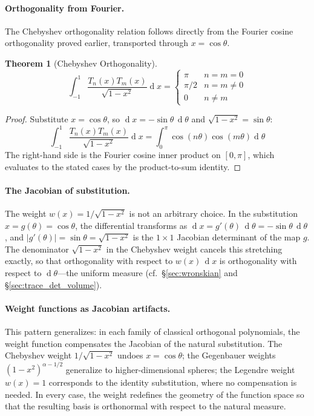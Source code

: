 \documentclass[12pt,a4paper]{report}
\DeclareMathOperator{\deriv}{d}
\theoremstyle{thms}
\newtheorem{theorem}{Theorem}[section]
\theoremstyle{defns}
\begin{document}
\paragraph{Orthogonality from Fourier.} The Chebyshev orthogonality relation follows directly from the Fourier cosine orthogonality proved earlier, transported through $x = \cos\theta$.

\begin{theorem}[Chebyshev Orthogonality]
    \begin{equation}
        \int_{-1}^{1} \dfrac{T_n(x)T_m(x)}{\sqrt{1-x^2}}\deriv{x} = \begin{cases} \pi & n = m = 0 \\ \pi/2 & n = m \neq 0 \\ 0 & n \neq m \end{cases}
    \end{equation}
\end{theorem}

\begin{proof}
    Substitute $x = \cos\theta$, so $\deriv{x} = -\sin\theta\,\deriv\theta$ and $\sqrt{1-x^2} = \sin\theta$:
    \begin{equation}
        \int_{-1}^{1} \dfrac{T_n(x)T_m(x)}{\sqrt{1-x^2}}\deriv{x} = \int_{0}^{\pi} \cos(n\theta)\cos(m\theta)\deriv\theta
    \end{equation}
    The right-hand side is the Fourier cosine inner product on $[0, \pi]$, which evaluates to the stated cases by the product-to-sum identity.
\end{proof}

\paragraph{The Jacobian of substitution.} The weight $w(x) = 1/\sqrt{1-x^2}$ is not an arbitrary choice. In the substitution $x = g(\theta) = \cos\theta$, the differential transforms as $\deriv x = g'(\theta)\,\deriv\theta = -\sin\theta\,\deriv\theta$, and $|g'(\theta)| = \sin\theta = \sqrt{1-x^2}$ is the $1 \times 1$ Jacobian determinant of the map $g$. The denominator $\sqrt{1-x^2}$ in the Chebyshev weight cancels this stretching exactly, so that orthogonality with respect to $w(x)\,\deriv x$ is orthogonality with respect to $\deriv\theta$—the uniform measure (cf.\ \S\ref{sec:wronskian} and \S\ref{sec:trace_det_volume}).

\paragraph{Weight functions as Jacobian artifacts.} This pattern generalizes: in each family of classical orthogonal polynomials, the weight function compensates the Jacobian of the natural substitution. The Chebyshev weight $1/\sqrt{1-x^2}$ undoes $x = \cos\theta$; the Gegenbauer weights $(1-x^2)^{\alpha - 1/2}$ generalize to higher-dimensional spheres; the Legendre weight $w(x) = 1$ corresponds to the identity substitution, where no compensation is needed. In every case, the weight redefines the geometry of the function space so that the resulting basis is orthonormal with respect to the natural measure.
\end{document}
